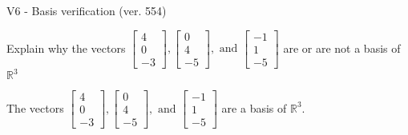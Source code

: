 \begin{exercise}
  \begin{exerciseTitle}V6 - Basis verification (ver. 554)\end{exerciseTitle}
  \begin{exerciseStatement}
    Explain why the vectors \(\left[\begin{array}{r}
4 \\
0 \\
-3
\end{array}\right] , \left[\begin{array}{r}
0 \\
4 \\
-5
\end{array}\right] , \text{ and } \left[\begin{array}{r}
-1 \\
1 \\
-5
\end{array}\right]\) are or are not a basis of \(\mathbb{R}^3\)	


  \end{exerciseStatement}
  \begin{exerciseAnswer}
   The vectors \(\left[\begin{array}{r}
4 \\
0 \\
-3
\end{array}\right] , \left[\begin{array}{r}
0 \\
4 \\
-5
\end{array}\right] , \text{ and } \left[\begin{array}{r}
-1 \\
1 \\
-5
\end{array}\right]\) 
  	 are  a basis of \(\mathbb{R}^3\).
  


  \end{exerciseAnswer}
\end{exercise}